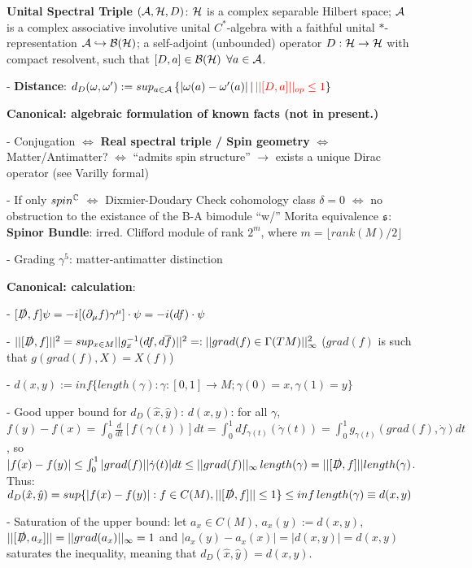         
    
    \textbf{Unital Spectral Triple} $(\mathcal A , \mathcal H, D)$: $\mathcal H$ is a complex separable Hilbert space; $\mathcal A$ is a complex associative involutive unital $C^*$-algebra with a faithful unital $*$-representation $\mathcal A \hookrightarrow \mathcal B(\mathcal H)$; a self-adjoint (unbounded) operator $D: \mathcal H \to \mathcal H$ with compact resolvent, such that $[D, a] \in \mathcal B(\mathcal H)$ $\forall a \in \mathcal A$.
    
    - \textbf{Distance}: $d_D(\omega, \omega') := sup_{a \in \mathcal A} \left\{|\omega(a) - \omega'(a)| \, | \, \textcolor{red}{||[D, a]||_{op} \leq 1} \right\}$
    

\textbf{Canonical: algebraic formulation of known facts (not in present.)}

 - Conjugation $\iff$ \textbf{Real spectral triple / Spin geometry} $\iff$ Matter/Antimatter? $\iff$ ``admits spin structure'' $\to$ exists a unique Dirac operator (see Varilly formal)
 
 - If only $spin^{\mathbb{C}}$ $\iff$ Dixmier-Doudary Check cohomology class $\delta = 0$ $\iff$ no obstruction to the existance of the B-A bimodule ``w/'' Morita equivalence $\mathfrak{s}$: \textbf{Spinor Bundle}: irred. Clifford module of rank $2^m$, where $m = \lfloor rank(M)/2 \rfloor$
 
 - Grading $\gamma^5$: matter-antimatter distinction


\textbf{Canonical: calculation}:

- $[\slashed D, f]\psi = -i [(\partial_\mu f) \gamma^\mu] \cdot \psi = -i(df)\cdot \psi$
    
    - $||[\slashed D, f]||^2 = sup_{x \in M} ||g_x^{-1}(df, d \overline{f})||^2 =: ||grad(f) \in \Gamma(TM)||_\infty^2$ ($grad(f)$ is such that $g(grad(f), X) = X(f)$)

    - $d(x, y) := inf\{length(\gamma): \gamma:[0,1] \to M; \gamma(0) = x, \gamma(1) = y\}$
    
    - Good upper bound for $d_D(\hat x, \hat y)$: $d(x, y)$: for all $\gamma$, $f(y) - f(x) = \int_0^1 \frac{d}{dt}[f(\gamma(t))]dt = \int_0^1 df_{\gamma(t)} (\dot \gamma(t)) = \int_0^1 g_{\gamma(t)}(grad(f), \dot \gamma) dt$, 
    so
    $|f(x) - f(y)| \leq \int_0^1 |grad(f)| |\dot \gamma(t)| dt \leq ||grad(f)||_
    \infty \, length(\gamma) = ||[\slashed D, f]|| length(\gamma)$. 
    Thus:
    $d_D(\hat x, \hat y) = sup\{|f(x) - f(y)|: f \in C(M), ||[\slashed D, f]||\leq 1\} \leq inf \, length(\gamma) \equiv d(x, y)$
    
    - Saturation of the upper bound: let $a_x \in C(M)$, $a_x(y) := d(x, y)$, %
    $||[\slashed D, a_x]|| = ||grad(a_x)||_\infty = 1$ and $|a_x(y) - a_x(x)| = |d(x,y)| = d(x,y)$ saturates the inequality, meaning that $ d_D(\hat x, \hat y) = d(x, y)$.
    
\linea